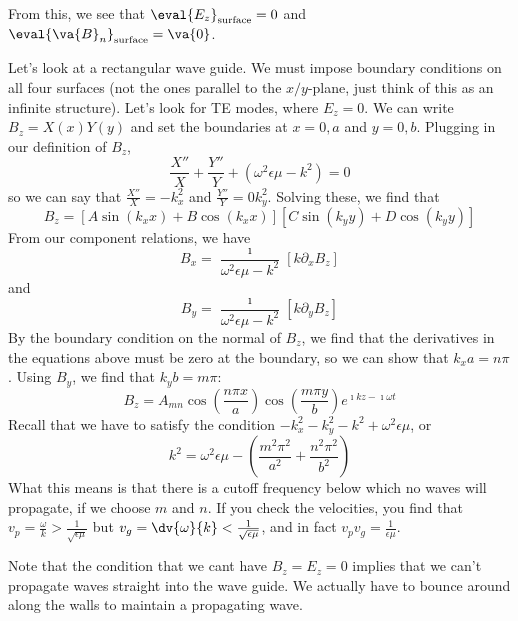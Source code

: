 \documentclass[a4paper,twoside,master.tex]{subfiles}
\begin{document}
From this, we see that $ \eval{E_z}_{\text{surface}} = 0 $ and $ \eval{ \va{B}_n}_{\text{surface}} = \va{0} $.

\begin{ex}
    Let's look at a rectangular wave guide. We must impose boundary conditions on all four surfaces (not the ones parallel to the $ x/y $-plane, just think of this as an infinite structure). Let's look for TE modes, where $ E_z = 0 $. We can write $ B_z = X(x) Y(y) $ and set the boundaries at $ x = 0, a $ and $ y = 0, b $.
    Plugging in our definition of $ B_z $,
    \begin{equation}
        \frac{X''}{X} + \frac{Y''}{Y} + (\omega^2 \epsilon \mu - k^2) = 0
    \end{equation}
    so we can say that $ \frac{X''}{X} = - k_x^2 $ and $ \frac{Y''}{Y} = 0 k_y^2 $. Solving these, we find that
    \begin{equation}
        B_z = [A \sin(k_x x) + B \cos(k_x x)][C \sin(k_y y) + D \cos(k_y y)]
    \end{equation}
    From our component relations, we have
    \begin{equation}
        B_x = \frac{\imath}{\omega^2 \epsilon \mu - k^2} [k \partial_x B_z]
    \end{equation}
    and
    \begin{equation}
        B_y = \frac{\imath}{\omega^2 \epsilon \mu - k^2} [k \partial_y B_z]
    \end{equation}
    By the boundary condition on the normal of $ B_z $, we find that the derivatives in the equations above must be zero at the boundary, so we can show that $ k_x a = n \pi $. Using $ B_y $, we find that $ k_y b = m \pi $:
    \begin{equation}
        B_z = A_{mn} \cos(\frac{n \pi x}{a}) \cos(\frac{m \pi y}{b}) e^{\imath k z - \imath \omega t}
    \end{equation}
    Recall that we have to satisfy the condition $ - k_x^2 - k_y^2 - k^2 + \omega^2 \epsilon \mu $, or
    \begin{equation}
        k^2 = \omega^2 \epsilon \mu - \left( \frac{m^2 \pi^2}{a^2} + \frac{n^2 \pi^2}{b^2} \right)
    \end{equation}
    What this means is that there is a cutoff frequency below which no waves will propagate, if we choose $ m $ and $ n $. If you check the velocities, you find that $ v_p = \frac{\omega}{k} > \frac{1}{\sqrt{\epsilon \mu}} $ but $ v_g = \dv{\omega}{k} < \frac{1}{\sqrt{\epsilon \mu}} $, and in fact $ v_p v_g = \frac{1}{\epsilon \mu} $.

    Note that the condition that we cant have $ B_z = E_z = 0 $ implies that we can't propagate waves straight into the wave guide. We actually have to bounce around along the walls to maintain a propagating wave.
\end{ex}
\end{document}

